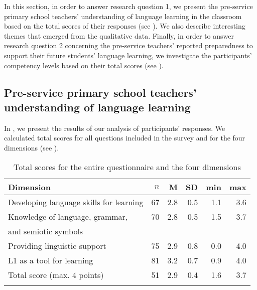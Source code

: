 \documentclass[output=paper]{langscibook}
\begin{document}
In this section, in order to answer research question 1, we present the pre-service primary school teachers’ understanding of language learning in the classroom based on the total scores of their responses (see ). We also describe interesting themes that emerged from the qualitative data. Finally, in order to answer research question 2 concerning the pre-service teachers’ reported preparedness to support their future students’ language learning, we investigate the participants’ competency levels based on their total scores (see ).

\subsection{Pre-service primary school teachers’ understanding of language learning}\label{sec:alisaari:4.1}  %

In , we present the results of our analysis of participants’ responses. We calculated total scores for all questions included in the survey and for the four dimensions (see ).

\begin{table}
\begin{tabular}{l rrrrr}
\lsptoprule
Dimension & {$n$} & {M} & {SD} & {min} & {max}\\\midrule
Developing language skills for learning & 67 & 2.8 & 0.5 & 1.1 & 3.6\\
Knowledge of language, grammar,  & 70 & 2.8 & 0.5 & 1.5 & 3.7\\
   \quad and semiotic symbols\\
Providing linguistic support & 75 & 2.9 & 0.8 & 0.0 & 4.0\\
L1 as a tool for learning & 81 & 3.2 & 0.7 & 0.9 & 4.0\\
Total score (max. 4 points) & 51 & 2.9 & 0.4 & 1.6 & 3.7\\
\lspbottomrule
\end{tabular}
\caption{Total scores for the entire questionnaire and the four dimensions}
\label{tab:Alisaari:1}
\end{table}
\end{document}
